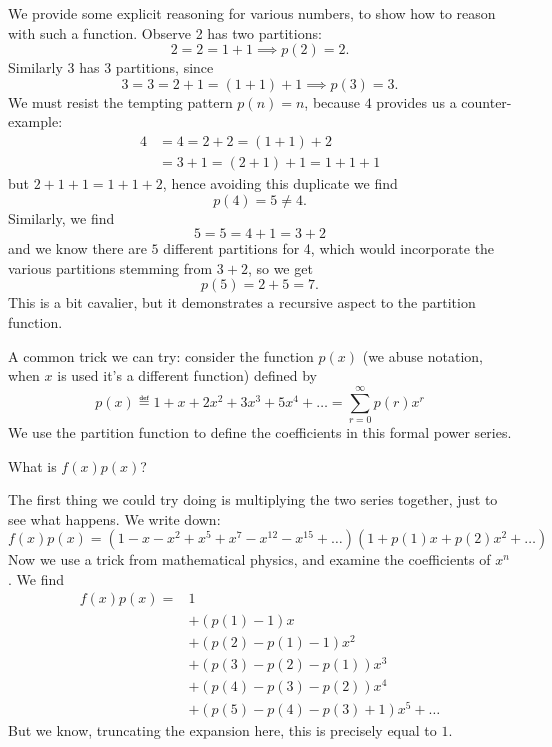 \documentclass{article}
\begin{document}
We provide some explicit reasoning for various numbers, to show how to
reason with such a function. Observe 2 has two partitions:
\begin{equation}
  2 = 2 = 1+1 \implies p(2)=2.
\end{equation}
Similarly 3 has 3 partitions, since
\begin{equation}
  3 = 3 = 2+1 = (1+1)+1 \implies p(3)=3.
\end{equation}
We must resist the tempting pattern $p(n)=n$, because $4$ provides us a
counter-example:
\begin{equation}
  \begin{split}
    4 &= 4 = 2 + 2 = (1 + 1) + 2\\
    &= 3 + 1 = (2 + 1) + 1 = 1+1+1
  \end{split}
\end{equation}
but $2+1+1=1+1+2$, hence avoiding this duplicate we find
\begin{equation}
  p(4) = 5\neq 4.
\end{equation}
Similarly, we find
\begin{equation}
  5 = 5 = 4 + 1 = 3 + 2
\end{equation}
and we know there are $5$ different partitions for 4, which would
incorporate the various partitions stemming from $3+2$, so we get
\begin{equation}
  p(5) = 2 + 5 = 7.
\end{equation}
This is a bit cavalier, but it demonstrates a recursive aspect to the
partition function.

A common trick we can try: consider the function $p(x)$ (we abuse
notation, when $x$ is used it's a different function) defined by
\begin{equation}
  p(x) \eqdef
  1 + x + 2x^{2} + 3x^{3} + 5x^{4} + \dots
  = \sum^{\infty}_{r=0}p(r)x^{r}
\end{equation}
We use the partition function to define the coefficients in this formal
power series.

What is $f(x)p(x)$?

The first thing we could try doing is multiplying the two series
together, just to see what happens. We write down:
\begin{equation}
  f(x)p(x) = (1 - x - x^{2} + x^{5} + x^{7} - x^{12} - x^{15} + \dots)(1
  + p(1)x + p(2)x^{2} + \dots)
\end{equation}
Now we use a trick from mathematical physics, and examine the
coefficients of $x^{n}$. We find
\begin{equation}
  \begin{split}
    f(x)p(x) =& 1\\
    &+ (p(1) - 1)x\\
    &+ (p(2) - p(1) - 1)x^{2}\\
    &+ (p(3) - p(2)-p(1))x^{3}\\
    &+ (p(4) - p(3) - p(2))x^{4}\\
    &+ (p(5) - p(4) - p(3) + 1)x^{5} + \dots
  \end{split}
\end{equation}
But we know, truncating the expansion here, this is precisely equal to
$1$.
\end{document}
